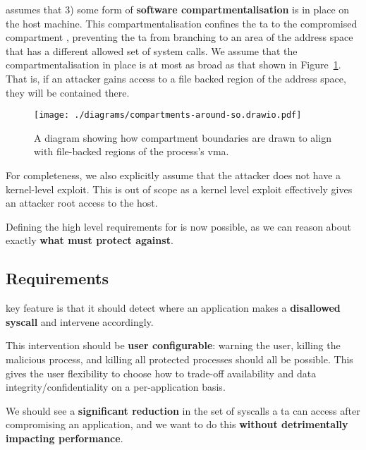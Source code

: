\af assumes that 3) some form of \textbf{software compartmentalisation} is in
place on the host machine. This compartmentalisation confines the \ac{ta} to the
compromised compartment \cite{SOK}, preventing the \ac{ta} 
from branching to an area of the address space that has a different allowed set
of system calls. We assume that the compartmentalisation in place is at most as
broad as that shown in Figure~\ref{fig:compartments-around-vma}. That is, if an
attacker gains access to a file backed region of the address space, they will be
contained there.

\begin{figure}[ht]
    \centering
    \texttt{[image: ./diagrams/compartments-around-so.drawio.pdf]} 
    \caption{A diagram showing how compartment boundaries are drawn to align
    with file-backed regions of the process's \ac{vma}.}
    \label{fig:compartments-around-vma}
\end{figure}

For completeness, we also explicitly assume that the attacker does not have a
kernel-level exploit. This is out of scope as a kernel level exploit effectively
gives an attacker root access to the host.

Defining the high level requirements for \af is now possible, as we can reason
about exactly \textbf{what \af must protect against}.


\subsection{Requirements} \label{subsec:requirements}

\afg key feature is that it should detect where an application makes a 
\textbf{disallowed syscall} and intervene accordingly. 

This intervention should be \textbf{user configurable}: warning the user, killing 
the malicious process, and killing all protected processes should all be
possible. This gives the user flexibility to choose how to trade-off
availability and data integrity/confidentiality on a per-application basis.

We should see a \textbf{significant reduction} in the set of syscalls a \ac{ta}
can access after compromising an application, and we want to do this
\textbf{without detrimentally impacting performance}.

